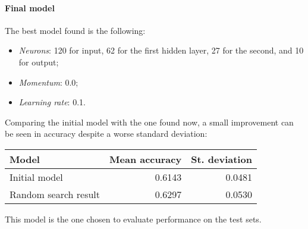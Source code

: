 \paragraph{Final model}
The best model found is the following: 
\begin{itemize}
    \item \emph{Neurons}: 120 for input, 62 for the first hidden layer, 27 for the second, and 10 for output; 
    \item \emph{Momentum}: 0.0;
    \item \emph{Learning rate}: 0.1.
\end{itemize}
Comparing the initial model with the one found now, a small improvement 
can be seen in accuracy despite a worse standard deviation:
\begin{center}
    \begin{tabular}{ |l|r|r| } 
        \hline
        Model & Mean accuracy & St. deviation \\
        \hline
        Initial model & 0.6143 & 0.0481\\
        Random search result & 0.6297 & 0.0530 \\
        \hline
    \end{tabular}
\end{center}
This model is the one chosen to evaluate performance on the test sets.
\newpage